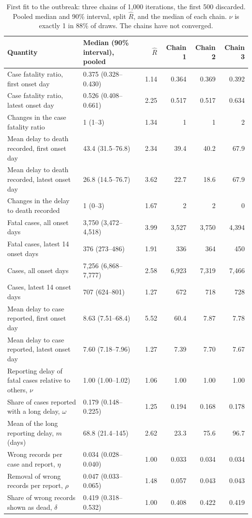 \documentclass[11pt,a4paper]{article}
\begin{document}
\begin{table}[h]
\centering\small
\begin{tabular}{p{6.3cm}lrrrr}
\toprule
Quantity & Median (90\% interval), pooled & $\hat R$ & Chain 1 & Chain 2 & Chain 3 \\
\midrule
Case fatality ratio, first onset day & 0.375 (0.328--0.430) & 1.14 & 0.364 & 0.369 & 0.392 \\
Case fatality ratio, latest onset day & 0.526 (0.408--0.661) & 2.25 & 0.517 & 0.517 & 0.634 \\
Changes in the case fatality ratio & 1 (1--3) & 1.34 & 1 & 1 & 2 \\
Mean delay to death recorded, first onset day & 43.4 (31.5--76.8) & 2.34 & 39.4 & 40.2 & 67.9 \\
Mean delay to death recorded, latest onset day & 26.8 (14.5--76.7) & 3.62 & 22.7 & 18.6 & 67.9 \\
Changes in the delay to death recorded & 1 (0--3) & 1.67 & 2 & 2 & 0 \\
Fatal cases, all onset days & 3{,}750 (3{,}472--4{,}518) & 3.99 & 3{,}527 & 3{,}750 & 4{,}394 \\
Fatal cases, latest 14 onset days & 376 (273--486) & 1.91 & 336 & 364 & 450 \\
Cases, all onset days & 7{,}256 (6{,}868--7{,}777) & 2.58 & 6{,}923 & 7{,}319 & 7{,}466 \\
Cases, latest 14 onset days & 707 (624--801) & 1.27 & 672 & 718 & 728 \\
Mean delay to case reported, first onset day & 8.63 (7.51--68.4) & 5.52 & 60.4 & 7.87 & 7.78 \\
Mean delay to case reported, latest onset day & 7.60 (7.18--7.96) & 1.27 & 7.39 & 7.70 & 7.67 \\
Reporting delay of fatal cases relative to others, $\nu$ & 1.00 (1.00--1.02) & 1.06 & 1.00 & 1.00 & 1.00 \\
Share of cases reported with a long delay, $\omega$ & 0.179 (0.148--0.225) & 1.25 & 0.194 & 0.168 & 0.178 \\
Mean of the long reporting delay, $m$ (days) & 68.8 (21.4--145) & 2.62 & 23.3 & 75.6 & 96.7 \\
Wrong records per case and report, $\eta$ & 0.034 (0.028--0.040) & 1.00 & 0.033 & 0.034 & 0.034 \\
Removal of wrong records per report, $\rho$ & 0.047 (0.033--0.065) & 1.48 & 0.057 & 0.043 & 0.043 \\
Share of wrong records shown as dead, $\delta$ & 0.419 (0.318--0.532) & 1.00 & 0.408 & 0.422 & 0.419 \\
\bottomrule
\end{tabular}
\caption{First fit to the outbreak: three chains of 1{,}000 iterations, the
first 500 discarded. Pooled median and 90\% interval, split $\hat R$, and
the median of each chain. $\nu$ is exactly 1 in 88\% of draws. The chains
have not converged.}
\label{tab:fit}
\end{table}
\end{document}
